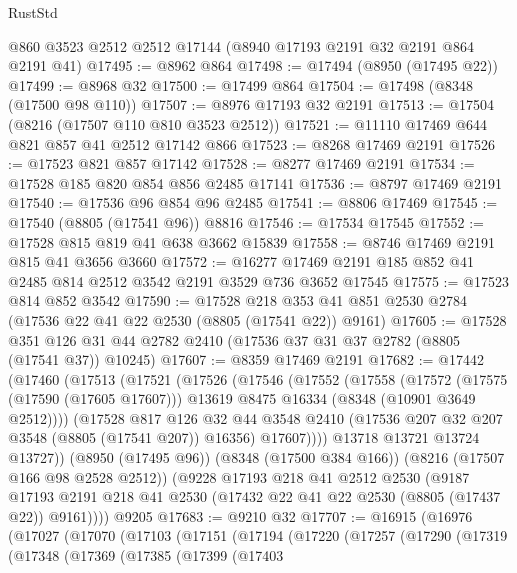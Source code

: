 \begin{lexlean}{RustStd}
\begin{coremodule}
    @860
    @3523
    @2512
    @2512
    @17144
    (@8940 @17193 @2191 @32 @2191 @864 @2191 @41)
@17495 := @8962 @864
@17498 := @17494 (@8950 (@17495 @22))
@17499 := @8968 @32
@17500 := @17499 @864
@17504 := @17498 (@8348 (@17500 @98 @110))
@17507 := @8976 @17193 @32 @2191
@17513 := @17504 (@8216 (@17507 @110 @810 @3523 @2512))
@17521 := @11110 @17469 @644 @821 @857 @41 @2512 @17142 @866
@17523 := @8268 @17469 @2191
@17526 := @17523 @821 @857 @17142
@17528 := @8277 @17469 @2191
@17534 := @17528 @185 @820 @854 @856 @2485 @17141
@17536 := @8797 @17469 @2191
@17540 := @17536 @96 @854 @96 @2485
@17541 := @8806 @17469
@17545 := @17540 (@8805 (@17541 @96)) @8816
@17546 := @17534 @17545
@17552 := @17528 @815 @819 @41 @638 @3662 @15839
@17558 := @8746 @17469 @2191 @815 @41 @3656 @3660
@17572 := @16277 @17469 @2191 @185 @852 @41 @2485 @814 @2512 @3542 @2191 @3529 @736 @3652 @17545
@17575 := @17523 @814 @852 @3542
@17590 := @17528
    @218
    @353
    @41
    @851
    @2530
    @2784
    (@17536 @22 @41 @22 @2530 (@8805 (@17541 @22)) @9161)
@17605 := @17528
    @351
    @126
    @31
    @44
    @2782
    @2410
    (@17536 @37 @31 @37 @2782 (@8805 (@17541 @37)) @10245)
@17607 := @8359 @17469 @2191
@17682 := @17442
    (@17460
      (@17513
        (@17521
          (@17526
            (@17546
              (@17552
                (@17558
                  (@17572
                    (@17575 (@17590 (@17605 @17607)))
                    @13619
                    @8475
                    @16334
                    (@8348 (@10901 @3649 @2512))))
                (@17528
                  @817
                  @126
                  @32
                  @44
                  @3548
                  @2410
                  (@17536 @207 @32 @207 @3548 (@8805 (@17541 @207)) @16356)
                  @17607))))
          @13718
          @13721
          @13724
          @13727))
      (@8950 (@17495 @96))
      (@8348 (@17500 @384 @166))
      (@8216 (@17507 @166 @98 @2528 @2512))
      (@9228
        @17193
        @218
        @41
        @2512
        @2530
        (@9187 @17193 @2191 @218 @41 @2530 (@17432 @22 @41 @22 @2530 (@8805 (@17437 @22)) @9161))))
    @9205
@17683 := @9210 @32
@17707 := @16915
    (@16976
      (@17027
        (@17070
          (@17103
            (@17151
              (@17194
                (@17220
                  (@17257
                    (@17290
                      (@17319
                        (@17348
                          (@17369
                            (@17385
                              (@17399
                                (@17403

\end{coremodule}
\end{lexlean}
